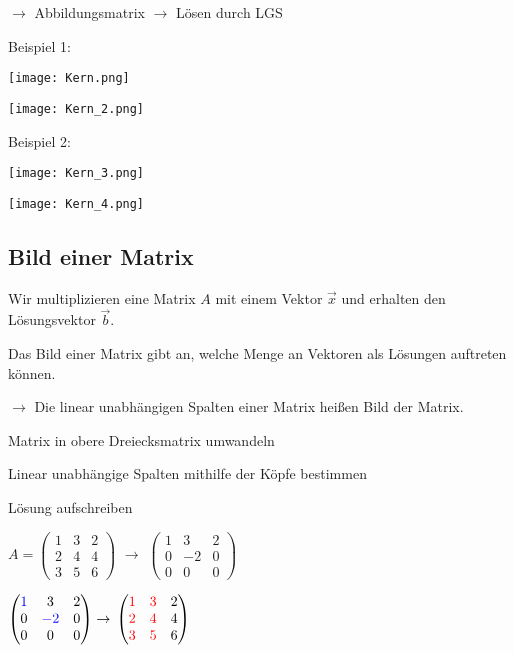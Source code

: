 \begin{multicols*}{3}
    {$\rightarrow$ Abbildungsmatrix  $\rightarrow$ Lösen durch LGS}

    {Beispiel 1:}

    {\texttt{[image: Kern.png]}}

    {\texttt{[image: Kern\_2.png]}}


    
    {Beispiel 2:}

    {\texttt{[image: Kern\_3.png]}}

    {\texttt{[image: Kern\_4.png]}}

    \subsection{ Bild einer Matrix}
    {Wir multiplizieren eine Matrix $A$  mit einem Vektor $\vec{x}$
        und erhalten den Lösungsvektor $\vec{b}$.}

    {Das Bild einer Matrix gibt an, welche Menge an Vektoren als Lösungen auftreten können.}

    {$\to$ Die linear unabhängigen Spalten einer Matrix heißen Bild der Matrix.}



    { Matrix in obere Dreiecksmatrix umwandeln}

    { Linear unabhängige Spalten mithilfe der Köpfe bestimmen}

    { Lösung aufschreiben}

    {$A =  \begin{pmatrix} 1 & 3 & 2 \\ 2 & 4 & 4 \\ 3 & 5 & 6 \end{pmatrix}$   {$\to$ $\begin{pmatrix} 1 & 3 & 2 \\ 0 & -2 & 0 \\ 0 & 0 & 0 \end{pmatrix}$}}

    { $\begin{pmatrix} {\color{blue}1} & 3 & 2 \\ 0 & {\color{blue}-2} & 0 \\ 0 & 0 & 0 \end{pmatrix} \rightarrow$   $\begin{pmatrix} {\color{red}1} & {\color{red}3} & 2 \\ {\color{red}2} & {\color{red}4} & 4 \\ {\color{red}3} & {\color{red}5} & 6 \end{pmatrix}$}


\end{multicols*}
